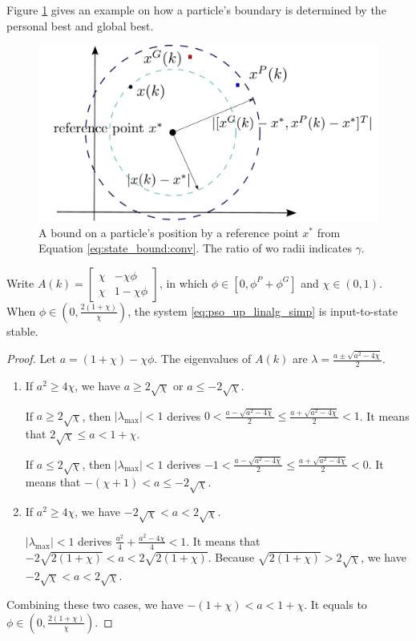 Figure \ref{fig:boundary} gives an example on how a particle's boundary is determined by the personal best and global best.

\begin{figure}
\centering
\includegraphics[width=0.6\linewidth]{./fig/boundary}
\caption{A bound on a particle's position by a reference point $ x^{*} $ from Equation \ref{eq:state_bound:conv}.
The ratio of wo radii indicates $ \gamma $.}
\label{fig:boundary}
\end{figure}

\begin{mycoro}
\label{coro:param_unit_disc}
Write $ A(k) = 
\begin{bmatrix}
\chi & - \chi \phi \\
\chi & 1 - \chi \phi
\end{bmatrix}
$, in which
$ \phi \in [0,  \phi^{P} + \phi^{G} ] $ and $ \chi \in ( 0, 1 ) $.
When $ \phi \in (0 , \frac{2(1+\chi)}{\chi} ) $, the system \eqref{eq:pso_up_linalg_simp} is input-to-state stable.
\begin{proof}
Let $ a = (1 + \chi) - \chi \phi $. 
The eigenvalues of $ A(k) $ are
$ \lambda = \frac{ a \pm \sqrt{ a^{2} - 4 \chi } }{2} $.

\begin{enumerate}
\item If $ a^{2} \geq 4 \chi $, we have $ a \geq 2 \sqrt{\chi} $ or $ a \leq - 2 \sqrt{\chi} $.

If $ a \geq 2 \sqrt{\chi} $, then $ | \lambda_{\max} | < 1 $ derives $ 0 < \frac{a-\sqrt{a^{2}-4\chi}}{2} \leq \frac{a+\sqrt{a^{2}-4\chi}}{2} < 1 $.
It means that $ 2 \sqrt{ \chi } \leq a < 1 + \chi $.

If $ a \leq 2 \sqrt{\chi} $, then $ | \lambda_{\max} | < 1 $ derives $ -1 < \frac{a-\sqrt{a^{2}-4\chi}}{2} \leq \frac{a+\sqrt{a^{2}-4\chi}}{2} < 0 $.
It means that $ - (\chi+1) < a \leq - 2 \sqrt{\chi} $.

\item If $ a^{2} \geq 4 \chi $, we have $ - 2 \sqrt{\chi} < a < 2 \sqrt{\chi} $.

$ | \lambda_{\max} | < 1 $ derives $ \frac{ a^{2} }{4} + \frac{ a^{2} - 4\chi }{4} < 1 $.
It means that $ - 2 \sqrt{ 2(1+\chi) } < a < 2 \sqrt{ 2(1+\chi) } $.
Because $ \sqrt{ 2(1+\chi) } > 2 \sqrt{ \chi } $, we have $ - 2 \sqrt{\chi} < a < 2 \sqrt{\chi} $.
\end{enumerate}
Combining these two cases, we have  $ - (1 + \chi) < a < 1 + \chi $.
It equals to $ \phi \in (0 , \frac{2(1+\chi)}{\chi} ) $.

\end{proof}
\end{mycoro}

